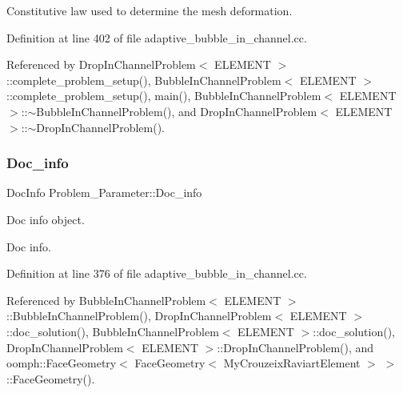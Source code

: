 Constitutive law used to determine the mesh deformation. 



Definition at line 402 of file adaptive\+\_\+bubble\+\_\+in\+\_\+channel.\+cc.



Referenced by Drop\+In\+Channel\+Problem$<$ E\+L\+E\+M\+E\+N\+T $>$\+::complete\+\_\+problem\+\_\+setup(), Bubble\+In\+Channel\+Problem$<$ E\+L\+E\+M\+E\+N\+T $>$\+::complete\+\_\+problem\+\_\+setup(), main(), Bubble\+In\+Channel\+Problem$<$ E\+L\+E\+M\+E\+N\+T $>$\+::$\sim$\+Bubble\+In\+Channel\+Problem(), and Drop\+In\+Channel\+Problem$<$ E\+L\+E\+M\+E\+N\+T $>$\+::$\sim$\+Drop\+In\+Channel\+Problem().

\mbox{\label{namespaceProblem__Parameter_a1dd3c6bcf97360c8fe0d288ca7610351}} 
\subsubsection{\texorpdfstring{Doc\+\_\+info}{Doc\_info}}
{\footnotesize\ttfamily Doc\+Info Problem\+\_\+\+Parameter\+::\+Doc\+\_\+info}



Doc info object. 

Doc info. 

Definition at line 376 of file adaptive\+\_\+bubble\+\_\+in\+\_\+channel.\+cc.



Referenced by Bubble\+In\+Channel\+Problem$<$ E\+L\+E\+M\+E\+N\+T $>$\+::\+Bubble\+In\+Channel\+Problem(), Drop\+In\+Channel\+Problem$<$ E\+L\+E\+M\+E\+N\+T $>$\+::doc\+\_\+solution(), Bubble\+In\+Channel\+Problem$<$ E\+L\+E\+M\+E\+N\+T $>$\+::doc\+\_\+solution(), Drop\+In\+Channel\+Problem$<$ E\+L\+E\+M\+E\+N\+T $>$\+::\+Drop\+In\+Channel\+Problem(), and oomph\+::\+Face\+Geometry$<$ Face\+Geometry$<$ My\+Crouzeix\+Raviart\+Element $>$ $>$\+::\+Face\+Geometry().

\mbox{\label{namespaceProblem__Parameter_a7792613e563a733ad88b8e15d126fc3a}} 
